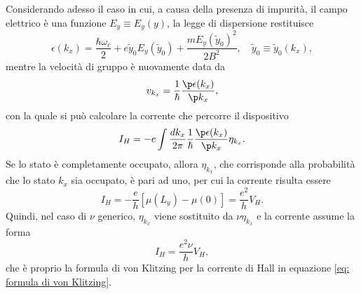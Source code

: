 Considerando adesso il caso in cui, a causa della presenza di impurità, il campo elettrico è una funzione $E_y \equiv E_y(y)$, la legge di dispersione restituisce
\begin{equation}
    \epsilon(k_x) = \frac{\hbar\omega_c}{2} + e\tilde{y}_0E_y(\tilde{y}_0) + \frac{mE_y(\tilde{y}_0)^2}{2B^2},\quad \tilde{y}_0 \equiv \tilde{y}_0(k_x),
\end{equation}
mentre la velocità di gruppo è nuovamente data da
\begin{equation}
    v_{k_x} = \frac{1}{\hbar}\frac{\p\epsilon(k_x)}{\p k_x},
\end{equation}
con la quale si può calcolare la corrente che percorre il dispositivo
\begin{equation}
    I_H = -e\int\frac{dk_x}{2\pi}\frac{1}{\hbar}\frac{\p\epsilon(k_x)}{\p k_x}\eta_{k_x}.
\end{equation}
Se lo stato è completamente occupato, allora $\eta_{k_x}$, che corrisponde alla probabilità che lo stato $k_x$ sia occupato, è pari ad uno, per cui la corrente risulta essere
\begin{equation}
    I_H = -\frac{e}{h}[\mu(L_y) - \mu(0)] = \frac{e^2}{h}V_H.
\end{equation}
Quindi, nel caso di $\nu$ generico, $\eta_{k_x}$ viene sostituito da $\nu \eta_{k_x}$ e la corrente assume la forma
\begin{equation}
    I_H = \frac{e^2\nu}{h}V_H,
\end{equation}
che è proprio la formula di von Klitzing per la corrente di Hall in equazione \eqref{eq: formula di von Klitzing}.

